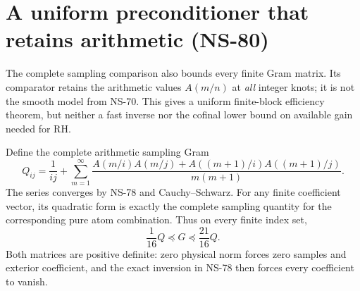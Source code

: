 \section{A uniform preconditioner that retains arithmetic (NS-80)}
\label{sec:ns80-arithmetic-preconditioner}

The complete sampling comparison also bounds every finite Gram matrix.
Its comparator retains the arithmetic values $A(m/n)$ at \emph{all}
integer knots; it is not the smooth model from NS-70. This gives a
uniform finite-block efficiency theorem, but neither a fast inverse
nor the cofinal lower bound on available gain needed for RH.

Define the complete arithmetic sampling Gram
\begin{equation}
 Q_{ij}=\frac1{ij}+\sum_{m=1}^\infty\frac{
 A(m/i)A(m/j)+A((m+1)/i)A((m+1)/j)}{m(m+1)}.
 \label{eq:ns80-sampling-gram}
\end{equation}
The series converges by NS-78 and Cauchy--Schwarz. For any finite
coefficient vector, its quadratic form is exactly the complete
sampling quantity for the corresponding pure atom combination.
Thus on every finite index set,
\begin{equation}
 \frac1{16}Q\preceq G\preceq\frac{21}{16}Q.
 \label{eq:ns80-full-comparison}
\end{equation}
Both matrices are positive definite: zero physical norm forces zero
samples and exterior coefficient, and the exact inversion in NS-78
then forces every coefficient to vanish.

